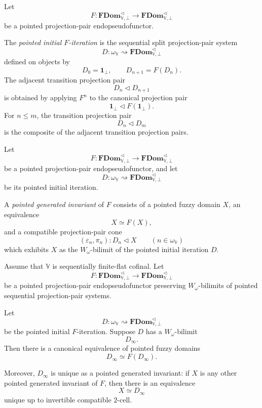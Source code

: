 \begin{definition}
\label{def:pointed-initial-iteration}
Let
\[
    F:
    \mathbf{FDom}^{\triangleleft}_{\mathbb V,\bot}
    \to
    \mathbf{FDom}^{\triangleleft}_{\mathbb V,\bot}
\]
be a pointed projection-pair endopseudofunctor.

The \emph{pointed initial \(F\)-iteration} is the sequential split
projection-pair system
\[
    D:\omega_{\mathbb V}
      \rightsquigarrow
      \mathbf{FDom}^{\triangleleft}_{\mathbb V,\bot}
\]
defined on objects by
\[
    D_0=\mathbf 1_\bot,
    \qquad
    D_{n+1}=F(D_n).
\]
The adjacent transition projection pair
\[
    D_n\triangleleft D_{n+1}
\]
is obtained by applying \(F^n\) to the canonical projection pair
\[
    \mathbf 1_\bot\triangleleft F(\mathbf 1_\bot).
\]
For \(n\leq m\), the transition projection pair
\[
    D_n\triangleleft D_m
\]
is the composite of the adjacent transition projection pairs.
\end{definition}

\begin{definition}
\label{def:pointed-generated-invariant}
Let
\[
    F:
    \mathbf{FDom}^{\triangleleft}_{\mathbb V,\bot}
    \to
    \mathbf{FDom}^{\triangleleft}_{\mathbb V,\bot}
\]
be a pointed projection-pair endopseudofunctor, and let
\[
    D:\omega_{\mathbb V}
      \rightsquigarrow
      \mathbf{FDom}^{\triangleleft}_{\mathbb V,\bot}
\]
be its pointed initial iteration.

A \emph{pointed generated invariant} of \(F\) consists of a pointed fuzzy domain
\(X\), an equivalence
\[
    X\simeq F(X),
\]
and a compatible projection-pair cone
\[
    (\varepsilon_n,\pi_n):D_n\triangleleft X
    \qquad(n\in\omega_{\mathbb V})
\]
which exhibits \(X\) as the \(W_\omega\)-bilimit of the pointed initial
iteration \(D\).
\end{definition}

\begin{theorem}
\label{thm:pointed-ff-minimal-invariant}
Assume that \(\mathbb V\) is sequentially finite-flat cofinal.  Let
\[
    F:
    \mathbf{FDom}^{\triangleleft}_{\mathbb V,\bot}
    \to
    \mathbf{FDom}^{\triangleleft}_{\mathbb V,\bot}
\]
be a pointed projection-pair endopseudofunctor preserving \(W_\omega\)-bilimits
of pointed sequential projection-pair systems.

Let
\[
    D:\omega_{\mathbb V}
      \rightsquigarrow
      \mathbf{FDom}^{\triangleleft}_{\mathbb V,\bot}
\]
be the pointed initial \(F\)-iteration.  Suppose \(D\) has a
\(W_\omega\)-bilimit
\[
    D_\infty.
\]
Then there is a canonical equivalence of pointed fuzzy domains
\[
    D_\infty\simeq F(D_\infty).
\]

Moreover, \(D_\infty\) is unique as a pointed generated invariant: if \(X\) is
any other pointed generated invariant of \(F\), then there is an equivalence
\[
    X\simeq D_\infty
\]
unique up to invertible compatible \(2\)-cell.
\end{theorem}

